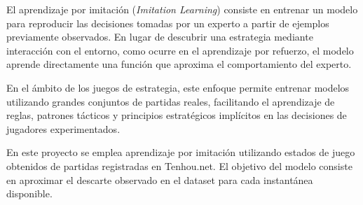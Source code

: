 El aprendizaje por imitación (\textit{Imitation Learning}) consiste en entrenar un modelo para reproducir las decisiones tomadas por un experto a partir de ejemplos previamente observados\cite{hussein2017imitation}. En lugar de descubrir una estrategia mediante interacción con el entorno, como ocurre en el aprendizaje por refuerzo, el modelo aprende directamente una función que aproxima el comportamiento del experto.

En el ámbito de los juegos de estrategia, este enfoque permite entrenar modelos utilizando grandes conjuntos de partidas reales, facilitando el aprendizaje de reglas, patrones tácticos y principios estratégicos implícitos en las decisiones de jugadores experimentados.

En este proyecto se emplea aprendizaje por imitación utilizando estados de juego obtenidos de partidas registradas en Tenhou.net. El objetivo del modelo consiste en aproximar el descarte observado en el dataset para cada instantánea disponible.
